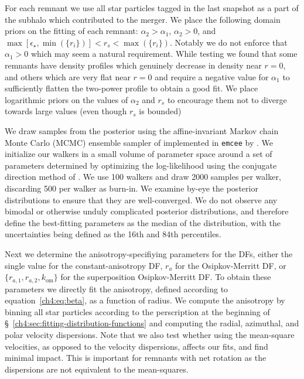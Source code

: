 
For each remnant we use all star particles tagged in the last snapshot as a part of the subhalo which contributed to the merger. We place the following domain priors on the fitting of each remnant: $\alpha_{2} > \alpha_{1}$, $\alpha_{2} > 0$, and $\max[\epsilon_{\star},\min(\{ r_{i} \})] < r_{s} < \max(\{ r_{i} \})$. Notably we do not enforce that $\alpha_{1} > 0$ which may seem a natural requirement. While testing we found that some remnants have density profiles which genuinely decrease in density near $r=0$, and others which are very flat near $r=0$ and require a negative value for $\alpha_{1}$ to sufficiently flatten the two-power profile to obtain a good fit. We place logarithmic priors on the values of $\alpha_{2}$ and $r_{s}$ to encourage them not to diverge towards large values (even though $r_{s}$ is bounded)

We draw samples from the posterior using the affine-invariant Markov chain Monte Carlo (MCMC) ensemble sampler of \textcite{goodman10} implemented in \texttt{emcee} by \textcite{foreman-mackey13}. We initialize our walkers in a small volume of parameter space around a set of parameters determined by optimizing the log-likelihood using the conjugate direction method of \textcite{powell64}. We use 100 walkers and draw 2000 samples per walker, discarding 500 per walker as burn-in. We examine by-eye the posterior distributions to ensure that they are well-converged. We do not observe any bimodal or otherwise unduly complicated posterior distributions, and therefore define the best-fitting parameters as the median of the distribution, with the uncertainties being defined as the 16th and 84th percentiles.

Next we determine the anisotropy-specifiying parameters for the DFs, either the single value for the constant-anisotropy DF, $r_{a}$ for the Osipkov-Merritt DF, or $\{ r_{a,1},r_{a,2},k_\mathrm{om} \}$ for the superposition Osipkov-Merritt DF. To obtain these parameters we directly fit the anisotropy, defined according to equation~\eqref{ch4:eq:beta}, as a function of radius. We compute the anisotropy by binning all star particles according to the perscription at the beginning of \S~\ref{ch4:sec:fitting-distribution-functions} and computing the radial, azimuthal, and polar velocity dispersions. Note that we also test whether using the mean-square velocities, as opposed to the velocity dispersions, affects our fits, and find minimal impact. This is important for remnants with net rotation as the dispersions are not equivalent to the mean-squares.

